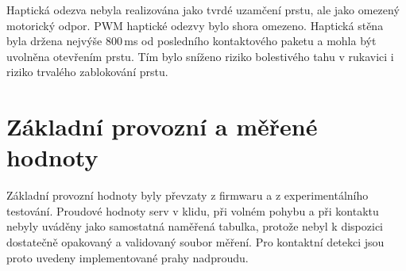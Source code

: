 Haptická odezva nebyla realizována jako tvrdé uzamčení prstu, ale jako omezený motorický odpor. PWM haptické odezvy bylo shora omezeno. Haptická stěna byla držena nejvýše 800\,ms od posledního kontaktového paketu a mohla být uvolněna otevřením prstu. Tím bylo sníženo riziko bolestivého tahu v rukavici i riziko trvalého zablokování prstu.

\section{Základní provozní a měřené hodnoty}
\label{sec:provozni-hodnoty}

Základní provozní hodnoty byly převzaty z firmwaru a z experimentálního testování. Proudové hodnoty serv v klidu, při volném pohybu a při kontaktu nebyly uváděny jako samostatná naměřená tabulka, protože nebyl k dispozici dostatečně opakovaný a validovaný soubor měření. Pro kontaktní detekci jsou proto uvedeny implementované prahy nadproudu.

